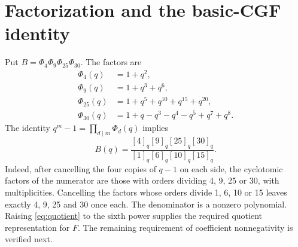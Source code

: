 \documentclass[11pt]{article}
\begin{document}
\section{Factorization and the basic-CGF identity}
Put $B=\Phi_4\Phi_9\Phi_{25}\Phi_{30}$. The factors are
\begin{align*}
 \Phi_4(q)&=1+q^2,\\
 \Phi_9(q)&=1+q^3+q^6,\\
 \Phi_{25}(q)&=1+q^5+q^{10}+q^{15}+q^{20},\\
 \Phi_{30}(q)&=1+q-q^3-q^4-q^5+q^7+q^8.
\end{align*}
The identity $q^m-1=\prod_{d\mid m}\Phi_d(q)$ implies
\begin{equation}\label{eq:quotient}
 B(q)=\frac{[4]_q[9]_q[25]_q[30]_q}
                    {[1]_q[6]_q[10]_q[15]_q}.
\end{equation}
Indeed, after cancelling the four copies of $q-1$ on each side, the
cyclotomic factors of the numerator are those with orders dividing
4, 9, 25 or 30, with multiplicities. Cancelling the factors whose orders
divide 1, 6, 10 or 15 leaves exactly 4, 9, 25 and 30 once each.
The denominator is a nonzero polynomial. Raising \eqref{eq:quotient} to
the sixth power supplies the required quotient representation for $F$.
The remaining requirement of coefficient nonnegativity is verified next.
\end{document}
